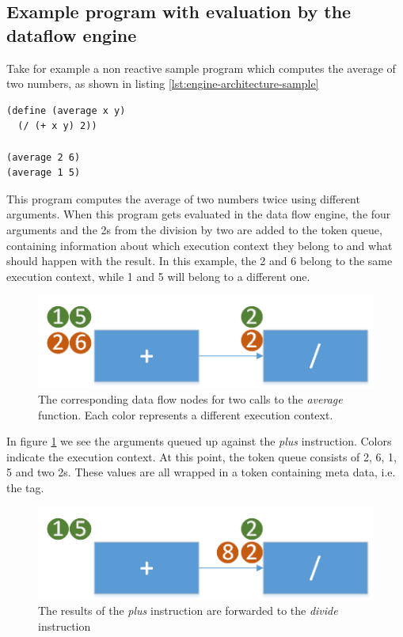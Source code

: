 \subsection{Example program with evaluation by the dataflow engine}

Take for example a non reactive sample program which computes the average of two numbers, as shown in listing \ref{lst:engine-architecture-sample}

\begin{lstlisting}[caption={Computing the average of two numbers},captionpos=b,label={lst:engine-architecture-sample},language=FrDataFlow]
(define (average x y)
  (/ (+ x y) 2))
  
(average 2 6)
(average 1 5)
\end{lstlisting}

This program computes the average of two numbers twice using different arguments. When this program gets evaluated in the data flow engine, the four arguments and the 2s from the division by two are added to the token queue, containing information about which execution context they belong to and what should happen with the result. 
In this example, the 2 and 6 belong to the same execution context, while 1 and 5 will belong to a different one. 

\begin{figure}[h!]
	\includegraphics[width=\textwidth]{images/Engine-Architecture-1.png}
	\caption{The corresponding data flow nodes for two calls to the \textit{average} function. Each color represents a different execution context.}
	\label{fig:engine-architecture-1}
\end{figure}

In figure \ref{fig:engine-architecture-1} we see the arguments queued up against the \textit{plus} instruction. Colors indicate the execution context. At this point, the token queue consists of 2, 6, 1, 5 and two 2s. These values are all wrapped in a token containing meta data, i.e. the tag. 

\begin{figure}[h!]
	\includegraphics[width=\textwidth]{images/Engine-Architecture-2.png}
	\caption{The results of the \textit{plus} instruction are forwarded to the \textit{divide} instruction}
	\label{fig:engine-architecture-2}
\end{figure}


